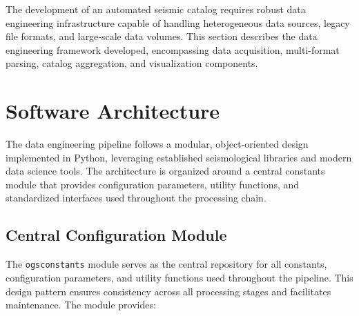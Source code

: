 \label{chap:data_engineering}

The development of an automated seismic catalog requires robust data
engineering infrastructure capable of handling heterogeneous data sources,
legacy file formats, and large-scale data volumes. This section describes the
data engineering framework developed, encompassing data acquisition,
multi-format parsing, catalog aggregation, and visualization components.

\section{Software Architecture}

The data engineering pipeline follows a modular, object-oriented design
implemented in Python, leveraging established seismological libraries and
modern data science tools. The architecture is organized around a central
constants module that provides configuration parameters, utility functions,
and standardized interfaces used throughout the processing chain.

\subsection{Central Configuration Module}
The \texttt{ogsconstants} module serves as the central repository for all
constants, configuration parameters, and utility functions used throughout the
pipeline. This design pattern ensures consistency across all processing stages
and facilitates maintenance. The module provides:

